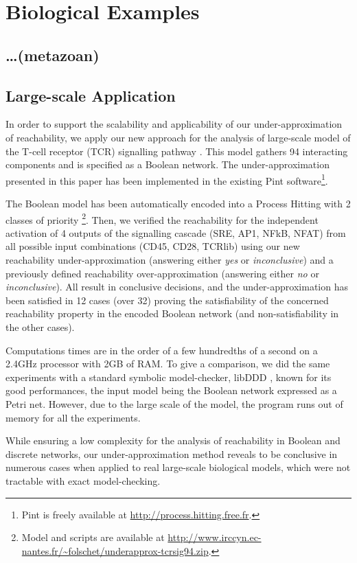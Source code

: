 
\section{Biological Examples}\label{sec:example}

\subsection{\ldots (metazoan)}

\subsection{Large-scale Application}

In order to support the scalability and applicability of our under-approximation of reachability, we
apply our new approach for the analysis of large-scale model of the T-cell receptor (TCR)
signalling pathway \cite{tcrsig94}.
This model gathers 94 interacting components and is specified as a Boolean network.
The under-approximation presented in this paper has been implemented in the existing Pint
software\footnote{Pint is freely available at \url{http://process.hitting.free.fr}.}.

The Boolean model has been automatically encoded into a Process Hitting with 2 classes of priority%
\footnote{Model and scripts are available at
\url{http://www.irccyn.ec-nantes.fr/~folschet/underapprox-tcrsig94.zip}.}.
Then, we verified the reachability for the independent activation of 4 outputs of the signalling
cascade (SRE, AP1, NFkB, NFAT) from all possible input combinations (CD45, CD28, TCRlib) using our
new reachability under-approximation (answering either \emph{yes} or \emph{inconclusive}) and a 
previously defined reachability over-approximation \cite{PMR12-MSCS} (answering either \emph{no} or
\emph{inconclusive}).
All result in conclusive decisions, and the under-approximation has been satisfied in 12 cases (over
32) proving the satisfiability of the concerned reachability property in the encoded Boolean network
(and non-satisfiability in the other cases).

Computations times are in the order of a few hundredths of a second on a 2.4GHz processor with 2GB
of RAM.
To give a comparison, we did the same experiments with a standard symbolic model-checker, libDDD
\cite{libddd}, known for its good performances, the input model being the Boolean network expressed
as a Petri net.
However, due to the large scale of the model, the program runs out of memory for all the experiments.

While ensuring a low complexity for the analysis of reachability in Boolean and discrete networks, our
under-approximation method reveals to be conclusive in numerous cases when applied to real
large-scale biological models, which were not tractable with exact model-checking.

